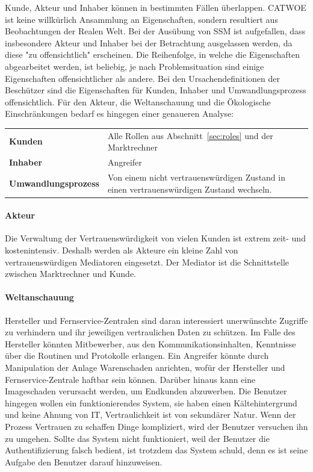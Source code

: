 \documentclass[11pt,a4paper]{report}
\begin{document}
Kunde, Akteur und Inhaber können in bestimmten Fällen überlappen. CATWOE ist keine willkürlich Ansammlung an Eigenschaften, sondern resultiert aus Beobachtungen der Realen Welt. Bei der Ausübung von SSM ist aufgefallen, dass insbesondere Akteur und Inhaber bei der Betrachtung ausgelassen werden, da diese "zu offensichtlich" erscheinen\cite{gutmann7}. Die Reihenfolge, in welche die Eigenschaften abgearbeitet werden, ist beliebig, je nach Problemsituation sind einige Eigenschaften offensichtlicher als andere. Bei den Ursachendefinitionen der Beschützer sind die Eigenschaften für Kunden, Inhaber und Umwandlungsprozess offensichtlich. Für den Akteur, die Weltanschauung und die Ökologische Einschränkungen bedarf es hingegen einer genaueren Analyse:

\setlength{\tabcolsep}{12pt}
\renewcommand{\arraystretch}{1.5}
\begin{table}[h] %
\begin{tabularx}{\linewidth}{@{}lX@{}}
\textbf{Kunden} & Alle Rollen aus Abschnitt~\ref{sec:roles} und der Marktrechner\\
\textbf{Inhaber} & Angreifer\\
\textbf{Umwandlungsprozess} & 
Von einem nicht vertrauenswürdigen Zustand in einen vertrauenswürdigen Zustand wechseln.\\
\end{tabularx}
\end{table}

\paragraph{Akteur} Die Verwaltung der Vertrauenswürdigkeit von vielen Kunden ist extrem zeit- und kostenintensiv. Deshalb werden als Akteure ein kleine Zahl von vertrauenswürdigen Mediatoren eingesetzt. Der Mediator ist die Schnittstelle zwischen Marktrechner und Kunde.

\paragraph{Weltanschauung} Hersteller und Fernservice-Zentralen sind daran interessiert unerwünschte Zugriffe zu verhindern und ihr jeweiligen vertraulichen Daten zu schützen. Im Falle des Hersteller könnten Mitbewerber, aus den Kommunikationsinhalten, Kenntnisse über die Routinen und Protokolle erlangen. Ein Angreifer könnte durch Manipulation der Anlage Warenschaden anrichten, wofür der Hersteller und Fernservice-Zentrale haftbar sein können. Darüber hinaus kann eine Imageschaden verursacht werden, um Endkunden abzuwerben. Die Benutzer hingegen wollen ein funktionierendes System, sie haben einen Kältehintergrund und keine Ahnung von IT, Vertraulichkeit ist von sekundärer Natur. Wenn der Prozess Vertrauen zu schaffen Dinge kompliziert, wird der Benutzer versuchen ihn zu umgehen. Sollte das System nicht funktioniert, weil der Benutzer die Authentifizierung falsch bedient, ist trotzdem das System schuld, denn es ist seine Aufgabe den Benutzer darauf hinzuweisen.
\end{document}
